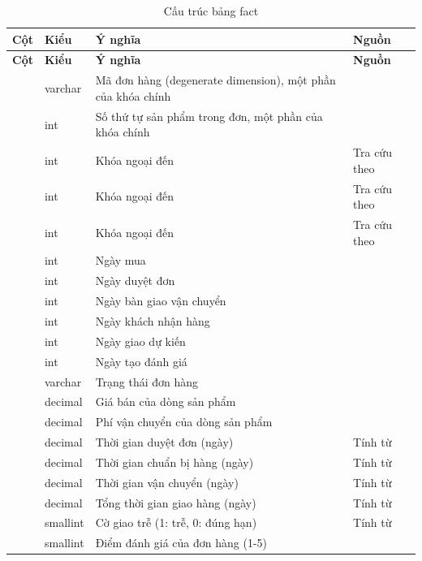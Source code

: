 \begingroup\small{}
\begin{longtable}{|P{3.9cm}|P{1.7cm}|P{4.2cm}|P{3.9cm}|}
\caption{Cấu trúc bảng fact }\label{tab:fact}\\
\hline
\textbf{Cột} & \textbf{Kiểu} & \textbf{Ý nghĩa} & \textbf{Nguồn}\\ \hline \endfirsthead
\hline
\textbf{Cột} & \textbf{Kiểu} & \textbf{Ý nghĩa} & \textbf{Nguồn}\\ \hline \endhead
{} & varchar & Mã đơn hàng (degenerate dimension), một phần của khóa chính & \\ \hline
{} & int & Số thứ tự sản phẩm trong đơn, một phần của khóa chính & \\ \hline
{} & int & Khóa ngoại đến  & Tra cứu theo \\ \hline
{} & int & Khóa ngoại đến  & Tra cứu theo \\ \hline
{} & int & Khóa ngoại đến  & Tra cứu theo \\ \hline
{} & int & Ngày mua & \\ \hline
{} & int & Ngày duyệt đơn & \\ \hline
{} & int & Ngày bàn giao vận chuyển & \\ \hline
{} & int & Ngày khách nhận hàng & \\ \hline
{} & int & Ngày giao dự kiến & \\ \hline
{} & int & Ngày tạo đánh giá & \\ \hline
{} & varchar & Trạng thái đơn hàng & \\ \hline
{} & decimal & Giá bán của dòng sản phẩm & \\ \hline
{} & decimal & Phí vận chuyển của dòng sản phẩm & \\ \hline
{} & decimal & Thời gian duyệt đơn (ngày) & Tính từ \\ \hline
{} & decimal & Thời gian chuẩn bị hàng (ngày) & Tính từ \\ \hline
{} & decimal & Thời gian vận chuyển (ngày) & Tính từ \\ \hline
{} & decimal & Tổng thời gian giao hàng (ngày) & Tính từ \\ \hline
{} & smallint & Cờ giao trễ (1: trễ, 0: đúng hạn) & Tính từ \\ \hline
{} & smallint & Điểm đánh giá của đơn hàng (1-5) & \\ \hline
\end{longtable}
\endgroup

